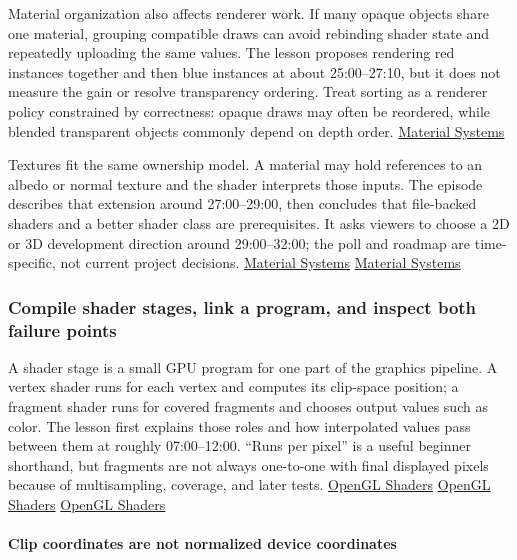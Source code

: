 Material organization also affects renderer work. If many opaque objects share one material, grouping compatible draws can avoid rebinding shader state and repeatedly uploading the same values. The lesson proposes rendering red instances together and then blue instances at about 25:00--27:10, but it does not measure the gain or resolve transparency ordering. Treat sorting as a renderer policy constrained by correctness: opaque draws may often be reordered, while blended transparent objects commonly depend on depth order. \href{https://www.youtube.com/watch?v=2k5FjtMNQsM&t=1500s}{Material Systems}

Textures fit the same ownership model. A material may hold references to an albedo or normal texture and the shader interprets those inputs. The episode describes that extension around 27:00--29:00, then concludes that file-backed shaders and a better shader class are prerequisites. It asks viewers to choose a 2D or 3D development direction around 29:00--32:00; the poll and roadmap are time-specific, not current project decisions. \href{https://www.youtube.com/watch?v=2k5FjtMNQsM&t=1620s}{Material Systems} \href{https://www.youtube.com/watch?v=2k5FjtMNQsM&t=1740s}{Material Systems}

\subsubsection{Compile shader stages, link a program, and inspect both failure points}\label{compile-shader-stages-link-a-program-and-inspect-both-failure-points}

A shader stage is a small GPU program for one part of the graphics pipeline. A vertex shader runs for each vertex and computes its clip-space position; a fragment shader runs for covered fragments and chooses output values such as color. The lesson first explains those roles and how interpolated values pass between them at roughly 07:00--12:00. ``Runs per pixel'' is a useful beginner shorthand, but fragments are not always one-to-one with final displayed pixels because of multisampling, coverage, and later tests. \href{https://www.youtube.com/watch?v=QBCCHm_9HV8&t=420s}{OpenGL Shaders} \href{https://www.youtube.com/watch?v=QBCCHm_9HV8&t=540s}{OpenGL Shaders} \href{https://www.youtube.com/watch?v=QBCCHm_9HV8&t=660s}{OpenGL Shaders}

\paragraph{Clip coordinates are not normalized device coordinates}\label{clip-coordinates-are-not-normalized-device-coordinates}

